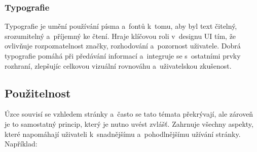 
\subsubsection{Typografie}
Typografie je umění používání písma a~fontů k~tomu, aby byl text čitelný, srozumitelný a~příjemný ke čtení. Hraje klíčovou roli v~designu UI tím, že ovlivňuje rozpoznatelnost značky, rozhodování a~pozornost uživatele. Dobrá typografie pomáhá při předávání informací a~integruje se s~ostatními prvky rozhraní, zlepšujíc celkovou vizuální rovnováhu a~uživatelskou zkušenost.

\subsection{Použitelnost}
Úzce souvisí se vzhledem stránky a~často se tato témata překrývají, ale zároveň je to samostatný princip, který je nutno uvést zvlášť. Zahrnuje všechny aspekty, které napomáhají uživateli k~snadnějšímu a~pohodlnějšímu užívání stránky. Například:

